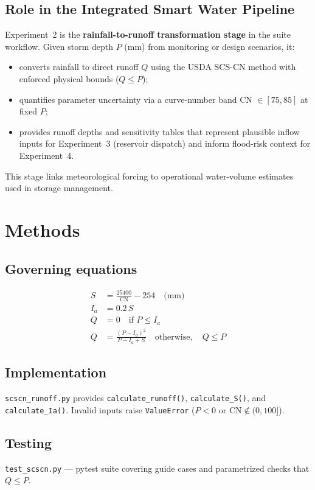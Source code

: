 \documentclass[11pt,a4paper]{article}
\begin{document}
\subsection{Role in the Integrated Smart Water Pipeline}
Experiment~2 is the \textbf{rainfall-to-runoff transformation stage} in the suite workflow. Given storm depth $P$ (mm) from monitoring or design scenarios, it:
\begin{itemize}[noitemsep]
  \item converts rainfall to direct runoff $Q$ using the USDA SCS-CN method with enforced physical bounds ($Q \le P$);
  \item quantifies parameter uncertainty via a curve-number band CN $\in [75,85]$ at fixed $P$;
  \item provides runoff depths and sensitivity tables that represent plausible inflow inputs for Experiment~3 (reservoir dispatch) and inform flood-risk context for Experiment~4.
\end{itemize}
This stage links meteorological forcing to operational water-volume estimates used in storage management.

\section{Methods}

\subsection{Governing equations}
\begin{align}
S &= \frac{25400}{\mathrm{CN}} - 254 \quad \text{(mm)} \\
I_a &= 0.2\,S \\
Q &= 0 \quad \text{if } P \le I_a \\
Q &= \frac{(P - I_a)^2}{P - I_a + S} \quad \text{otherwise}, \quad Q \le P
\end{align}

\subsection{Implementation}
\texttt{scscn\_runoff.py} provides \texttt{calculate\_runoff()}, \texttt{calculate\_S()}, and \texttt{calculate\_Ia()}. Invalid inputs raise \texttt{ValueError} ($P < 0$ or $\mathrm{CN} \notin (0,100]$).

\subsection{Testing}
\texttt{test\_scscn.py} --- pytest suite covering guide cases and parametrized checks that $Q \le P$.
\end{document}
